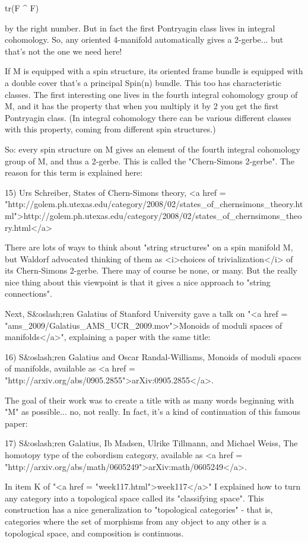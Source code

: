 tr(F ^ F)

by the right number.  But in fact the first Pontryagin class lives in
integral cohomology.  So, any oriented 4-manifold automatically gives 
a 2-gerbe... but that's not the one we need here!

If M is equipped with a spin structure, its oriented frame bundle is
equipped with a double cover that's a principal Spin(n) bundle.  This
too has characteristic classes.  The first interesting one lives
in the fourth integral cohomology group of M, and it has the 
property that when you multiply it by 2 you get the first Pontryagin 
class.  (In integral cohomology there can be various different
classes with this property, coming from different spin structures.)

So: every spin structure on M gives an element of the fourth integral
cohomology group of M, and thus a 2-gerbe.  This is called the
"Chern-Simons 2-gerbe".  The reason for this term is
explained here:

15) Urs Schreiber, States of Chern-Simons theory,
<a href = "http://golem.ph.utexas.edu/category/2008/02/states_of_chernsimons_theory.html">http://golem.ph.utexas.edu/category/2008/02/states_of_chernsimons_theory.html</a>

There are lots of ways to think about "string structures" on a spin
manifold M, but Waldorf advocated thinking of them as <i>choices of
trivialization</i> of its Chern-Simons 2-gerbe.  There may of course be
none, or many.  But the really nice thing about this viewpoint is that it
gives a nice approach to "string connections".  

Next, S&oslash;ren Galatius of Stanford University gave a talk on "<a
href = "ams_2009/Galatius_AMS_UCR_2009.mov">Monoids of moduli spaces
of manifolds</a>", explaining a paper with the same title:

16) S&oslash;ren Galatius and Oscar Randal-Williams, Monoids of
moduli spaces of manifolds, available as <a href = "http://arxiv.org/abs/0905.2855">arXiv:0905.2855</a>.

The goal of their work was to create a title with as many
words beginning with "M" as possible... no, not really.
In fact, it's a kind of continuation of this famous paper:

17) S&oslash;ren Galatius, Ib Madsen, Ulrike Tillmann, and Michael
Weiss, The homotopy type of the cobordism category, available as <a
href = "http://arxiv.org/abs/math/0605249">arXiv:math/0605249</a>.

In item K of "<a href = "week117.html">week117</a>" I explained
how to turn any category into a topological space called its
"classifying space".  This construction has a nice
generalization to "topological categories" - that is,
categories where the set of morphisms from any object to any other is
a topological space, and composition is continuous.  

